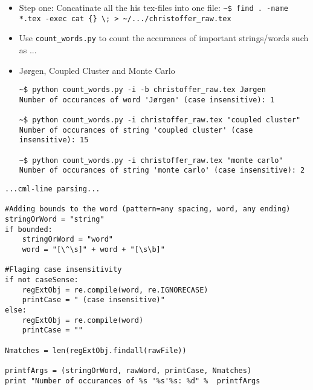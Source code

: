 \documentclass{beamer}
\begin{document}
\begin{frame}[containsverbatim]
\begin{itemize}
 \item Step one: Concatinate all the his tex-files into one file:  
 \vspace{0.2cm}
\scriptsize
\verb+~$ find . -name *.tex -exec cat {} \; > ~/.../christoffer_raw.tex+
\normalsize

 \item Use \verb+count_words.py+ to count the accurances of important strings/words such as ...

\end{itemize}
\end{frame}

\begin{frame}[containsverbatim]
\begin{itemize}

 \item Jørgen, Coupled Cluster and Monte Carlo
 \vspace{0.2cm}
\scriptsize
\begin{verbatim}
~$ python count_words.py -i -b christoffer_raw.tex Jørgen
Number of occurances of word 'Jørgen' (case insensitive): 1

~$ python count_words.py -i christoffer_raw.tex "coupled cluster"
Number of occurances of string 'coupled cluster' (case insensitive): 15

~$ python count_words.py -i christoffer_raw.tex "monte carlo"
Number of occurances of string 'monte carlo' (case insensitive): 2

\end{verbatim}
\normalsize
\end{itemize}
\end{frame}


\begin{frame}[containsverbatim]
\tiny
\begin{verbatim}
...cml-line parsing...

#Adding bounds to the word (pattern=any spacing, word, any ending)
stringOrWord = "string"
if bounded:
    stringOrWord = "word"
    word = "[\^\s]" + word + "[\s\b]"
    
#Flaging case insensitivity
if not caseSense:
    regExtObj = re.compile(word, re.IGNORECASE)
    printCase = " (case insensitive)"
else:
    regExtObj = re.compile(word)
    printCase = ""

Nmatches = len(regExtObj.findall(rawFile))

printfArgs = (stringOrWord, rawWord, printCase, Nmatches)
print "Number of occurances of %s '%s'%s: %d" %  printfArgs
\end{verbatim}
\normalsize
\end{frame}
\end{document}
